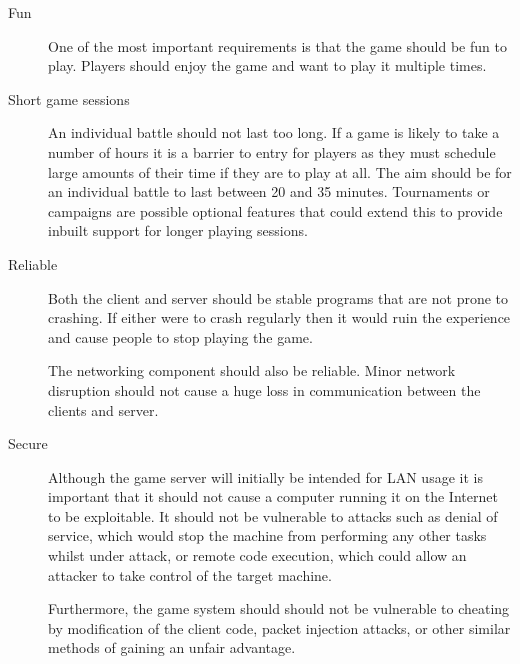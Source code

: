 \begin{description}

	\item[Fun]

	One of the most important requirements is that the game should be fun to play. Players should enjoy the game and want to play it multiple times.

	\item[Short game sessions]

	An individual battle should not last too long. If a game is likely to take a number of hours it is a barrier to entry for players as they must schedule large amounts of their time if they are to play at all. The aim should be for an individual battle to last between 20 and 35 minutes. Tournaments or campaigns are possible optional features that could extend this to provide inbuilt support for longer playing sessions.

	\item[Reliable]

	Both the client and server should be stable programs that are not prone to crashing. If either were to crash regularly then it would ruin the experience and cause people to stop playing the game.

	The networking component should also be reliable. Minor network disruption should not cause a huge loss in communication between the clients and server.

	\item[Secure] 
	
	Although the game server will initially be intended for LAN usage it is important that it should not cause a computer running it on the Internet to be exploitable. It should not be vulnerable to attacks such as denial of service, which would stop the machine from performing any other tasks whilst under attack, or remote code execution, which could allow an attacker to take control of the target machine. 
	
	Furthermore, the game system should should not be vulnerable to cheating by modification of the client code, packet injection attacks, or other similar methods of gaining an unfair advantage. 


\end{description}

